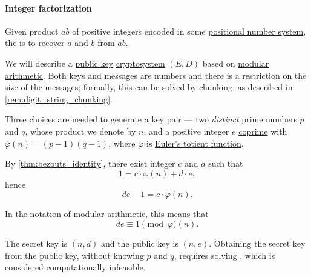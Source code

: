 \paragraph{Integer factorization}

\begin{problem}\label{prob:integer_factorization}
  Given product \( ab \) of positive integers encoded in some \hyperref[def:positional_number_system]{positional number system}, the  is to recover \( a \) and \( b \) from \( ab \).
\end{problem}

\begin{algorithm}\label{alg:rsa}
  We will describe a \hyperref[def:symmetric_cryptosystem]{public key} \hyperref[def:cryptosystem]{cryptosystem} \( (E, D) \) based on \hyperref[con:modular_arithmetic]{modular arithmetic}. Both keys and messages are numbers and there is a restriction on the size of the messages; formally, this can be solved by chunking, as described in \cref{rem:digit_string_chunking}.

  \begin{thmenum}
     Three choices are needed to generate a key pair --- two \emph{distinct} prime numbers \( p \) and \( q \), whose product we denote by \( n \), and a positive integer \( e \) \hyperref[def:coprime_numbers]{coprime} with \( \varphi(n) = (p - 1) (q - 1) \), where \( \varphi \) is \hyperref[def:eulers_totient_function]{Euler's totient function}.

    By \cref{thm:bezouts_identity}, there exist integer \( c \) and \( d \) such that
    \begin{equation*}
      1 = c \cdot \varphi(n) + d \cdot e,
    \end{equation*}
    hence
    \begin{equation*}
      de - 1 = c \cdot \varphi(n).
    \end{equation*}

    In the notation of modular arithmetic, this means that
    \begin{equation*}
      de \equiv 1 \pmod \varphi(n).
    \end{equation*}

    The secret key is \( (n, d) \) and the public key is \( (n, e) \). Obtaining the secret key from the public key, without knowing \( p \) and \( q \), requires solving , which is considered computationally infeasible.


\end{thmenum}
\end{algorithm}
